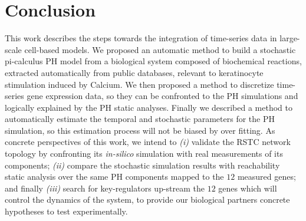 \section{Conclusion}
This work describes the steps towards the integration of time-series data in large-scale cell-based models. 
We proposed an automatic method to build a stochastic pi-calculus PH model from a biological system composed of biochemical reactions, extracted automatically from public databases, 
relevant to keratinocyte stimulation induced by Calcium. 
We then proposed a method to discretize time-series gene expression data, so they can be confronted to the PH simulations and logically explained by the PH static analyses. 
Finally we described a method to automatically estimate the temporal and stochastic
parameters for the PH simulation, so this estimation process will not be biased by over fitting.
As concrete perspectives of this work, we intend to \emph{(i)} validate the RSTC network topology by confronting its \emph{in-silico} simulation with real measurements of its components;
\emph{(ii)} compare the stochastic simulation results with reachability static analysis over the same PH components mapped to the $12$ measured genes; and 
finally \emph{(iii)} search for key-regulators up-stream the $12$ genes which will control the dynamics of the system, to  provide our biological partners concrete 
hypotheses to test experimentally.
